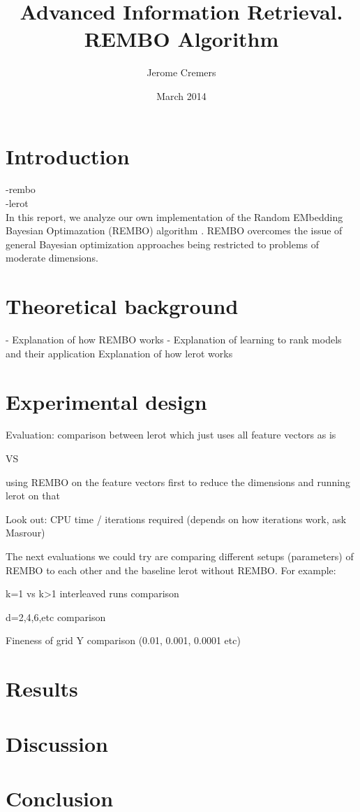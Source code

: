 \documentclass{article}
\title{Advanced Information Retrieval. REMBO Algorithm}
\author{Jerome Cremers}
\date{March 2014}
\begin{document}
\maketitle

\section{Introduction}
-rembo\\
-lerot\\

In this report, we analyze our own implementation of the Random EMbedding Bayesian Optimazation (REMBO) algorithm \cite{xu2007adarank}. REMBO overcomes the issue of general Bayesian optimization approaches being restricted to problems of moderate dimensions. 


\section{Theoretical background}
- Explanation of how REMBO works
- Explanation of learning to rank models and their application
    Explanation of how lerot works

\section{Experimental design}

Evaluation: comparison between lerot which just uses all feature vectors as is

VS

using REMBO on the feature vectors first to reduce the dimensions and running lerot on that

Look out: CPU time / iterations required (depends on how iterations work, ask Masrour)

The next evaluations we could try are comparing different setups (parameters) of REMBO to each other and the baseline lerot without REMBO. For example:

k=1 vs k>1 interleaved runs comparison

d=2,4,6,etc comparison

Fineness of grid Y comparison (0.01, 0.001, 0.0001 etc)

\section{Results}

\section{Discussion}

\section{Conclusion}


\end{document}
